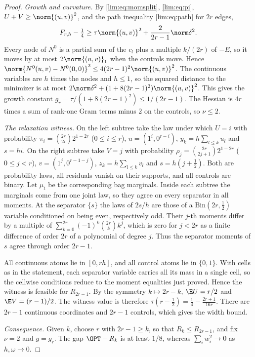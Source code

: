 \begin{proof}
\emph{Growth and curvature.} By \eqref{lim:eq:momsplit}, \eqref{lim:eq:pi},
$U+V\ge\norm{(u,v)}^2$, and the path inequality \eqref{lim:eq:path} for
$2r$ edges,
\[
F_{r,h}-\tfrac14\ge\tau\norm{(u,v)}^2+\frac2{2r-1}\norm\delta^2 .
\]
Every node of $N^0$ is a partial sum of the $c_l$ plus a multiple $k/(2r)$
of $-E$, so it moves by at most $2\norm{(u,v)}_1$ when the controls move.
Hence $\norm{N^0(u,v)-N^0(0,0)}^2\le4(2r-1)^2\norm{(u,v)}^2$. The continuous
variables are $h$ times the nodes and $h\le1$, so the squared distance to the
minimizer is at most $2\norm\delta^2+(1+8(2r-1)^2)\norm{(u,v)}^2$. This gives
the growth constant $g_r=\tau/(1+8(2r-1)^2)\le1/(2r-1)$. The Hessian is $4r$
times a sum of rank-one Gram terms minus $2$ on the controls, so $\nu\le2$.

\emph{The relaxation witness.} On the left subtree take the law under which
$U=i$ with probability $\pi_i=\binom{2r}{2i}2^{1-2r}$ ($0\le i\le r$),
$u=(1^i,0^{r-i})$, $y_k=h\sum_{l\le k}u_l$ and $s=hi$. On the right subtree
take $V=j$ with probability $\rho_j=\binom{2r}{2j+1}2^{1-2r}$ ($0\le j<r$),
$v=(1^j,0^{r-1-j})$, $z_k=h\sum_{l\le k}v_l$ and $s=h(j+\frac12)$. Both are
probability laws, all residuals vanish on their supports, and all controls are
binary. Let $\mu_t$ be the corresponding bag marginals. Inside each subtree
the marginals come from one joint law, so they agree on every separator in
all moments. At the separator $\{s\}$ the laws of $2s/h$ are those of a
$\mathrm{Bin}(2r,\frac12)$ variable conditioned on being even, respectively
odd. Their $j$-th moments differ by a multiple of
$\sum_{k=0}^{2r}(-1)^k\binom{2r}kk^j$, which is zero for $j<2r$ as a finite
difference of order $2r$ of a polynomial of degree $j$. Thus the separator
moments of $s$ agree through order $2r-1$.

All continuous atoms lie in $[0,rh]$, and all control atoms lie in
$\{0,1\}$. With cells as in the statement, each separator variable carries
all its mass in a single cell, so the cellwise conditions reduce to the
moment equalities just proved. Hence the witness is feasible for $R_{2r-1}$.
By the symmetry $k\mapsto2r-k$, $\E U=r/2$ and $\E V=(r-1)/2$. The witness
value is therefore $\tau(r-\frac12)=\frac14-\frac{2r+1}{16r}$. There are
$2r-1$ continuous coordinates and $2r-1$ controls, which gives the width
bound.

\emph{Consequence.} Given $k$, choose $r$ with $2r-1\ge k$, so that
$R_k\le R_{2r-1}$, and fix $\bar\nu=2$ and $g=g_r$. The gap $\OPT-R_k$ is at
least $1/8$, whereas $\sum_iw_i^2\to0$ as $h,\omega\to0$.
\end{proof}


